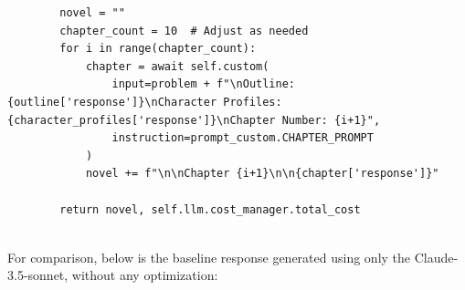 \begin{tcolorbox}[title={\textbf{\small Novel generation workflow}}, boxrule=2pt, arc=0mm, breakable]
\begin{verbatim}
        novel = ""
        chapter_count = 10  # Adjust as needed
        for i in range(chapter_count):
            chapter = await self.custom(
                input=problem + f"\nOutline: {outline['response']}\nCharacter Profiles: {character_profiles['response']}\nChapter Number: {i+1}",
                instruction=prompt_custom.CHAPTER_PROMPT
            )
            novel += f"\n\nChapter {i+1}\n\n{chapter['response']}"
        
        return novel, self.llm.cost_manager.total_cost


\end{verbatim}
\end{tcolorbox}

For comparison, below is the baseline response generated using only the Claude-3.5-sonnet, without any \model optimization:

\label{appendix:llm generate novel}

